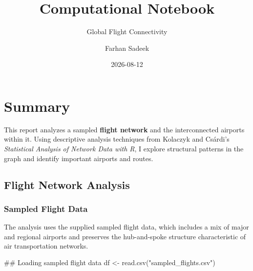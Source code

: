 \documentclass[
  letterpaper,
]{report}
\title{Computational Notebook}
\subtitle{Global Flight Connectivity}
\author{Farhan Sadeek}
\date{2026-08-12}
\newenvironment{Shaded}{}{}
\newcommand{\DocumentationTok}[1]{\textcolor[rgb]{0.42,0.45,0.49}{#1}}
\newcommand{\FunctionTok}[1]{\textcolor[rgb]{0.44,0.26,0.76}{#1}}
\newcommand{\NormalTok}[1]{\textcolor[rgb]{0.14,0.16,0.18}{#1}}
\newcommand{\OtherTok}[1]{\textcolor[rgb]{0.44,0.26,0.76}{#1}}
\newcommand{\StringTok}[1]{\textcolor[rgb]{0.01,0.18,0.38}{#1}}
\renewcommand*\contentsname{Table of contents}
\newcommand\contentsname{Table of contents}
\begin{document}
\maketitle

\renewcommand*\contentsname{Contents}
{
\hypersetup{linkcolor=}
\setcounter{tocdepth}{2}
\tableofcontents
}

\chapter{Summary}\label{summary}

This report analyzes a sampled \textbf{flight network} and the
interconnected airports within it. Using descriptive analysis techniques
from Kolaczyk and Csárdi's \emph{Statistical Analysis of Network Data
with R}, I explore structural patterns in the graph and identify
important airports and routes.

\section{Flight Network Analysis}\label{flight-network-analysis}

\subsection{Sampled Flight Data}\label{sampled-flight-data}

The analysis uses the supplied sampled flight data, which includes a mix
of major and regional airports and preserves the hub-and-spoke structure
characteristic of air transportation networks.

\begin{Shaded}
\begin{Highlighting}[]
\DocumentationTok{\#\# Loading sampled flight data}
\NormalTok{df }\OtherTok{\textless{}{-}} \FunctionTok{read.csv}\NormalTok{(}\StringTok{"sampled\_flights.csv"}\NormalTok{)}
\end{Highlighting}
\end{Shaded}
\end{document}
